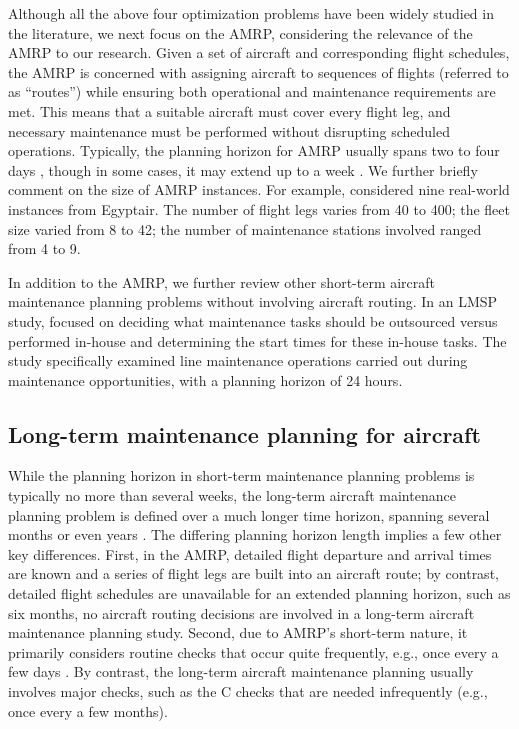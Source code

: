 Although all the above four optimization problems have been widely studied in the literature, we next focus on the AMRP, considering the relevance of the AMRP to our research. 
Given \color{black} a set of aircraft and corresponding flight schedules, the AMRP is concerned with assigning aircraft to sequences of flights (referred to as ``routes'') while ensuring both operational and maintenance requirements are met. This means that a suitable aircraft must cover every flight leg, and necessary maintenance must be performed without disrupting scheduled operations. Typically, the planning horizon for AMRP usually spans two to four days \citep{feo1989flight, eltoukhy2017airline}, though in some cases, it may extend up to a week \citep{sriram2003optimization, he2023maximizing}. 
We further briefly comment on the size of AMRP instances. For example, \cite{ruan2021reinforcement} considered nine real-world instances from Egyptair. The number of flight legs varies from 40 to 400; the fleet size varied from 8 to 42; the number of maintenance stations involved ranged from 4 to 9. 



In addition to the AMRP, we further review other short-term aircraft maintenance planning problems without involving aircraft routing. In an LMSP study, \cite{villafranca2025aircraft} focused on deciding what maintenance tasks should be outsourced versus performed in-house and determining the start times for these in-house tasks.
The study specifically examined line maintenance operations carried out during maintenance opportunities, with a planning horizon of 24 hours.



\subsection{Long-term maintenance planning for aircraft}
\label{sec:long_termPlanningRev}

While the planning horizon in short-term maintenance planning problems is typically no more than several weeks, the long-term aircraft maintenance planning problem is defined over a much longer time horizon, spanning several months or even years \citep{ma2022tackling}. The differing planning horizon length implies a few other key differences. First, in the AMRP, detailed flight departure and arrival times are known and a series of flight legs are built into an aircraft route; by contrast, detailed flight schedules are unavailable for an extended planning horizon, such as six months, no aircraft routing decisions are involved in a long-term aircraft maintenance planning study. 
Second, due to AMRP's short-term nature, it primarily considers routine checks that occur quite frequently, e.g., once every a few days \citep{sriram2003optimization}. By contrast, the long-term aircraft maintenance planning usually involves major checks, such as the C checks that are needed infrequently (e.g., once every a few months).

